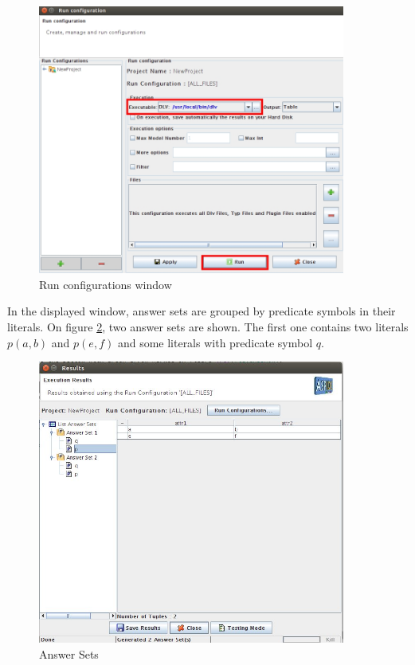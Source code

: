 \documentclass[12pt, letterpaper]{article}
\begin{document}
\begin{figure}[ht]
\centering
\includegraphics[width=0.9\textwidth]{answindow.jpg}
\caption{Run configurations window}
\label{fig:ansset}
\end{figure}
\pagebreak

In the displayed window, answer sets are grouped by predicate symbols in their literals.
On figure \ref{fig:ansres}, two answer sets are shown. The first one  contains two literals $p(a,b)$ and $p(e,f)$ and some literals with predicate symbol $q$.  
\begin{figure}[ht]
\centering
\includegraphics[width=0.9\textwidth]{results.jpg}
\caption{Answer Sets}
\label{fig:ansres}
\end{figure}
\end{document}
